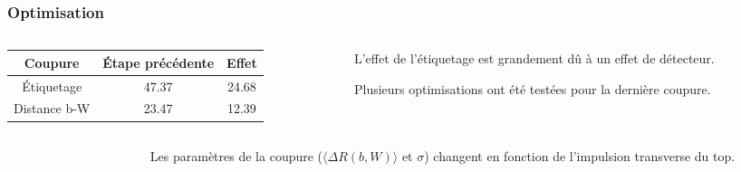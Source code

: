 \documentclass[usepdftitle=false,green]{beamer}
\begin{document}
\begin{frame}
	\frametitle{Optimisation}
	\begin{columns}
		\begin{column}{6.2cm}
			{\scriptsize
			\begin{tabular}{c|c|c}
				Coupure & \'Etape précédente & Effet \\
				\hline \hline
				\'Etiquetage & 47.37 & 24.68 \\
				Distance b-W & 23.47 & 12.39  \\
			\end{tabular}
			}
		\end{column}
		\begin{column}{6.2cm}
			\begin{itemize}
				{\footnotesize
				\item[$\bullet$] L'effet de l'étiquetage est grandement dû à un effet de détecteur.
				\item[$\bullet$] Plusieurs optimisations ont été testées pour la dernière coupure.
				}
			\end{itemize}	
		\end{column}
	\end{columns}
	\begin{columns}
		\begin{column}{9cm}
			\begin{figure}
			\end{figure}
		\end{column}
		\begin{column}{3.5cm}
			Les paramètres de la coupure {\scriptsize($\langle \Delta R(b,W) \rangle$ et $\sigma$)} changent en fonction de l'impulsion transverse du top.
		\end{column}
	\end{columns}
\end{frame}
\end{document}
